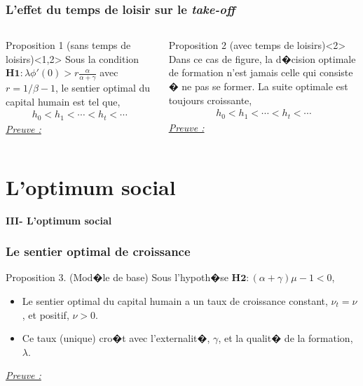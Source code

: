 \documentclass[10pt, hyperref={pdfpagemode=FullScreen}]{beamer} %
\begin{document}
\begin{frame}
\frametitle{L'effet du temps de loisir sur le \emph{take-off}}
     \begin{columns}
    \column{5.5cm}
\begin{block}{\scriptsize{Proposition 1 (sans temps de loisirs)}}<1,2>\label{proposition1}
Sous la condition $\mathbf{H1: } \lambda\phi'(0)>r\frac{\alpha}{\alpha+\gamma}$ avec $r=1/\beta-1$, le sentier optimal du capital humain est tel que,
\begin{eqnarray*}
h_{0}<h_{1}<\cdots<h_{t}<\cdots
\end{eqnarray*}
\emph{\underline{Preuve : \hyperlink{annexe1}{}}} 
\end{block}

\column{5.5cm}
\begin{block}{\scriptsize{Proposition 2 (avec temps de loisirs)}}<2>\label{proposition2}
Dans ce cas de figure, la d�cision optimale de formation n'est jamais celle qui consiste � ne pas se former. La suite optimale est toujours croissante,
\begin{eqnarray*}
h_{0}<h_{1}<\cdots<h_{t}<\cdots
\end{eqnarray*}
\emph{\underline{Preuve : \hyperlink{annexe2}{}}} 
\end{block}
\end{columns}
\end{frame}


\section{L'optimum social}
  
\begin{frame}
\transdissolve
\begin{block}{}
\centering \huge{\textbf{III- L'optimum social}}
\end{block}
\end{frame}
  
  
\begin{frame}
\frametitle{Le sentier optimal de croissance}
\begin{block}{Proposition 3. (Mod�le de base)}\label{proposition3}
Sous l'hypoth�se $\mathbf{H2 : } (\alpha+\gamma)\mu-1<0$,
\begin{itemize}
\item<2-| alert@2> Le sentier optimal du capital humain a un taux de croissance constant, $\nu_{t}=\nu$, et positif, $\nu>0$.
\item<3-| alert@3> Ce taux (unique) cro�t avec l'externalit�, $\gamma$, et la qualit� de la formation, $\lambda$.  
\end{itemize}
\emph{\underline{Preuve : \hyperlink{annexe3part1}{}}} 
\end{block}
\end{frame}
  
\end{document}
